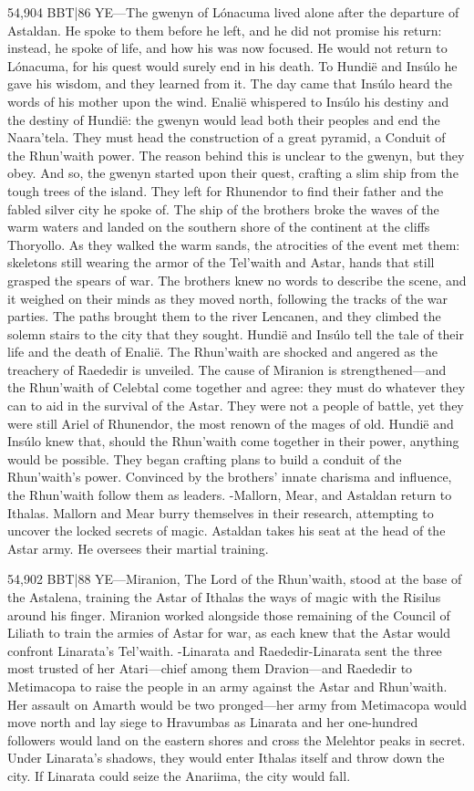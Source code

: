 \documentclass[smalldemyvopaper,11pt,twoside,onecolumn,openright,extrafontsizes]{memoir}
\begin{document}
{{54,904 BBT|86 YE—The gwenyn of Lónacuma lived alone after the departure of Astaldan. He spoke to them before he left, and he did not promise his return: instead, he spoke of life, and how his was now focused. He would not return to Lónacuma, for his quest would surely end in his death. To Hundië and Insúlo he gave his wisdom, and they learned from it. The day came that Insúlo heard the words of his mother upon the wind. Enalië whispered to Insúlo his destiny and the destiny of Hundië: the gwenyn would lead both their peoples and end the Naara’tela. They must head the construction of a great pyramid, a Conduit of the Rhun’waith power. The reason behind this is unclear to the gwenyn, but they obey.
	And so, the gwenyn started upon their quest, crafting a slim ship from the tough trees of the island. They left for Rhunendor to find their father and the fabled silver city he spoke of. The ship of the brothers broke the waves of the warm waters and landed on the southern shore of the continent at the cliffs Thoryollo. As they walked the warm sands, the atrocities of the event met them: skeletons still wearing the armor of the Tel’waith and Astar, hands that still grasped the spears of war. The brothers knew no words to describe the scene, and it weighed on their minds as they moved north, following the tracks of the war parties. The paths brought them to the river Lencanen, and they climbed the solemn stairs to the city that they sought.
Hundië and Insúlo tell the tale of their life and the death of Enalië. The Rhun’waith are shocked and angered as the treachery of Raededir is unveiled. The cause of Miranion is strengthened—and the Rhun’waith of Celebtal come together and agree: they must do whatever they can to aid in the survival of the Astar. They were not a people of battle, yet they were still Ariel of Rhunendor, the most renown of the mages of old. Hundië and Insúlo knew that, should the Rhun’waith come together in their power, anything would be possible. They began crafting plans to build a conduit of the Rhun’waith’s power. Convinced by the brothers’ innate charisma and influence, the Rhun’waith follow them as leaders.
-Mallorn, Mear, and Astaldan return to Ithalas. Mallorn and Mear burry themselves in their research, attempting to uncover the locked secrets of magic. Astaldan takes his seat at the head of the Astar army. He oversees their martial training.

54,902 BBT|88 YE—Miranion, The Lord of the Rhun’waith, stood at the base of the Astalena, training the Astar of Ithalas the ways of magic with the Risilus around his finger. Miranion worked alongside those remaining of the Council of Liliath to train the armies of Astar for war, as each knew that the Astar would confront Linarata’s Tel’waith.
-Linarata and Raededir-Linarata sent the three most trusted of her Atari—chief among them Dravion—and Raededir to Metimacopa to raise the people in an army against the Astar and Rhun’waith. Her assault on Amarth would be two pronged—her army from Metimacopa would move north and lay siege to Hravumbas as Linarata and her one-hundred followers would land on the eastern shores and cross the Melehtor peaks in secret. Under Linarata’s shadows, they would enter Ithalas itself and throw down the city. If Linarata could seize the Anariima, the city would fall.


}}
\end{document}
